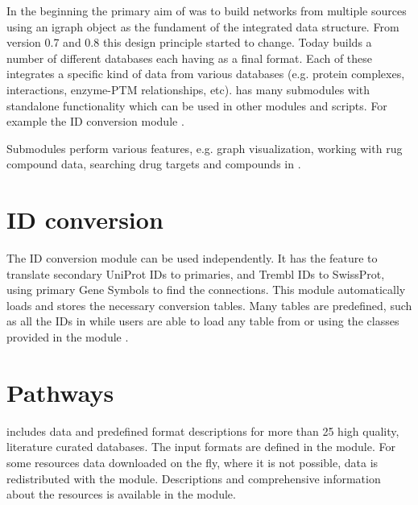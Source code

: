\documentclass[letterpaper,10pt,english]{sphinxmanual}
\begin{document}
In the beginning the primary aim of  was to build networks from
multiple sources using an igraph object as the fundament of the integrated
data structure. From version 0.7 and 0.8 this design principle started to
change. Today  builds a number of different databases each having
 as a final format. Each of these integrates a specific
kind of data from various databases (e.g. protein complexes, interactions,
enzyme-PTM relationships, etc).  has many submodules with standalone
functionality which can be used in other modules and scripts. For example
the ID conversion module .

Submodules perform various features, e.g. graph visualization, working with
rug compound data, searching drug targets and compounds in .


\section{ID conversion}
\label{\detokenize{index:id-conversion}}
The ID conversion module  can be used independently. It has
the feature to translate secondary UniProt IDs to primaries, and Trembl IDs to
SwissProt, using primary Gene Symbols to find the connections. This module
automatically loads and stores the necessary conversion tables. Many tables
are predefined, such as all the IDs in  while
users are able to load any table from  or  using the classes
provided in the module .


\section{Pathways}
\label{\detokenize{index:pathways}}
 includes data and predefined format descriptions for more than 25
high quality, literature curated databases. The input formats are defined in
the  module. For some resources data downloaded on the fly,
where it is not possible, data is redistributed with the module. Descriptions
and comprehensive information about the resources is available in the
 module.
\end{document}
